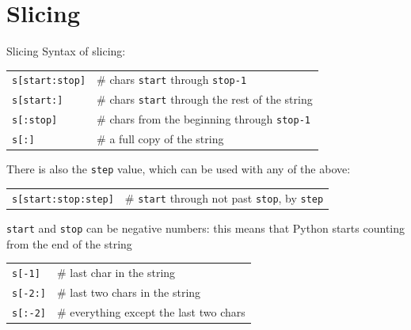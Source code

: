 \documentclass[t,handout,9pt]{beamer}
\begin{document}
\section{Slicing}
\begin{frame}{Slicing}
Syntax of slicing:
\begin{table}[]
\begin{flushleft}
\begin{tabular}{ll}
\texttt{s[start:stop]} &  \# chars \texttt{start} through \texttt{stop-1}\\
\texttt{s[start:]} &  \# chars \texttt{start} through the rest of the string\\
\texttt{s[:stop]} &  \# chars from the beginning through \texttt{stop-1}\\
\texttt{s[:]} &  \# a full copy of the string\\
\end{tabular}
\end{flushleft}
\end{table}
There is also the \texttt{step} value, which can be used with any of the above:
\begin{table}[]
\begin{flushleft}
\begin{tabular}{ll}
\texttt{s[start:stop:step]} &  \# \texttt{start} through not past \texttt{stop}, by \texttt{step}\\
\end{tabular}
\end{flushleft}
\end{table}
\texttt{start} and \texttt{stop} can be negative numbers: this means that Python starts counting from the end of the string
\begin{table}[]
\begin{flushleft}
\begin{tabular}{ll}
\texttt{s[-1]} &  \# last char in the string\\
\texttt{s[-2:]} &  \# last two chars in the string\\
\texttt{s[:-2]} &  \# everything except the last two chars\\
\end{tabular}
\end{flushleft}
\end{table}
\end{frame}
%
\end{document}
